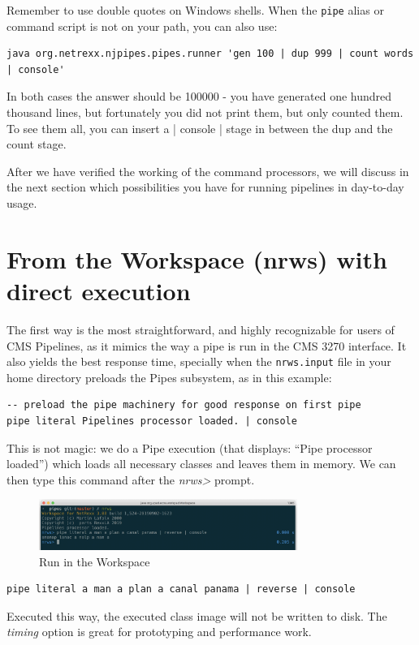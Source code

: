 Remember to use double quotes on Windows shells. When the \texttt{pipe}
alias or command script is not on your path, you can also use:

\begin{lstlisting}
java org.netrexx.njpipes.pipes.runner 'gen 100 | dup 999 | count words | console'
\end{lstlisting}

In both cases the answer should be 100000 - you have generated one
hundred thousand lines, but fortunately you did not print them, but
only counted them. To see them all, you can insert a | console | stage
in between the dup and the count stage.

After we have verified the working of the command processors, we will
discuss in the next section which possibilities you have for running
pipelines in day-to-day usage.



\section{From the \nr{} Workspace (nrws) with direct execution}
The first way is the most straightforward, and highly recognizable for
users of CMS Pipelines, as it mimics the way a pipe is run in the CMS
3270 interface. It also yields the best response time, specially when
the \texttt{nrws.input} file in your home directory preloads the Pipes subsystem, as in this
example:
\begin{verbatim}
-- preload the pipe machinery for good response on first pipe
pipe literal Pipelines processor loaded. | console
\end{verbatim}
This is not magic: we do a Pipe execution (that displays: ``Pipe
processor loaded'') which loads all necessary classes and leaves them
in memory. We can then type this command after the \emph{nrws>}
prompt.
\begin{figure}[h]
  \includegraphics[width=0.75\textwidth]{images/runnrws.png}
  \caption{Run in the \nr{} Workspace}
  \label{fig:runnrws}
\end{figure}

\begin{lstlisting}
pipe literal a man a plan a canal panama | reverse | console
\end{lstlisting}
Executed this way, the executed class image will not be written to
disk. The \emph{timing} option is great for prototyping and
performance work.
